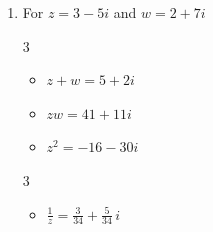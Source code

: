\documentclass{ximera}
\begin{document}
\begin{enumerate}
\begin{multicols}{3}
\end{multicols}

\begin{multicols}{3}

\begin{itemize}

\item $\frac{1}{z} = -\frac{1}{4} \,i$

\item $\frac{z}{w} = -1+i$

\item $\frac{w}{z} = -\frac{1}{2} - \frac{1}{2} \,i$

\end{itemize}

\end{multicols}

\begin{multicols}{3}

\begin{itemize}

\item $\overline{z} = -4i$

\item $z\overline{z} = 16$

\item $(\overline{z})^2 = -16$

\end{itemize}

\end{multicols}

\item  For  $z = 3-5i$ and $w = 2+7i$

\begin{multicols}{3}

\begin{itemize}

\item $z+w = 5+2i$

\item $zw = 41+11i$

\item $z^2 = -16-30i$

\end{itemize}

\end{multicols}

\begin{multicols}{3}

\begin{itemize}

\item $\frac{1}{z} = \frac{3}{34} + \frac{5}{34} \,i$


\end{itemize}
\end{multicols}
\end{enumerate}
\end{document}
